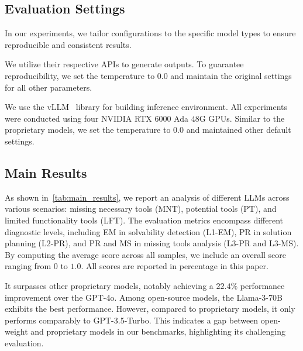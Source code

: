\documentclass[11pt]{article}
\begin{document}


\subsection{Evaluation Settings}

In our experiments, we tailor configurations to the specific model types to ensure reproducible and consistent results.

We utilize their respective APIs to generate outputs.
To guarantee reproducibility, we set the temperature to $0.0$ and maintain the original settings for all other parameters.

We use the vLLM~\cite{kwon2023efficient@vllm} library for building inference environment. 
All experiments were conducted using four NVIDIA RTX 6000 Ada $48$G GPUs.
Similar to the proprietary models, we set the temperature to $0.0$ and maintained other default settings. 

\subsection{Main Results}
As shown in~\cref{tab:main_results}, we report an analysis of different LLMs across various scenarios: missing necessary tools (MNT), potential tools (PT), and limited functionality tools (LFT).
The evaluation metrics encompass different diagnostic levels, including EM in solvability detection (L1-EM), PR in solution planning (L2-PR), and PR and MS in missing tools analysis (L3-PR and L3-MS). 
By computing the average score across all samples, we include an overall score ranging from $0$ to $1.0$. All scores are reported in percentage in this paper.

It surpasses other proprietary models, notably achieving a $22.4\%$ performance improvement over the GPT-4o. 
Among open-source models, the Llama-3-70B exhibits the best performance. 
However, compared to proprietary models, it only performs comparably to GPT-3.5-Turbo. 
This indicates a gap between open-weight and proprietary models in our benchmarks, highlighting its challenging evaluation.
\end{document}
